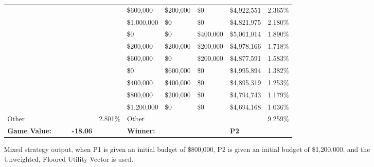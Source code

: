 \documentclass[11pt]{article}
\begin{document}
\begin{figure}
\begin{tabular}{ |p{1.0cm}p{1.0cm}p{1.0cm}p{2.0cm}|p{1.0cm}||p{1.0cm}p{1.0cm}p{1.0cm}p{2.0cm}|p{1.0cm}|}
& & & &                                                 & \$600,000 & \$200,000 & \$0 & \$4,922,551 & 2.365\% \\
& & & &                                                 & \$1,000,000 & \$0 & \$0 & \$4,821,975 & 2.180\% \\
& & & &                                                 & \$0 & \$0 & \$400,000 & \$5,061,014 & 1.890\% \\
& & & &                                                 & \$200,000 & \$200,000 & \$200,000 & \$4,978,166 & 1.718\% \\
& & & &                                                 & \$600,000 & \$0 & \$200,000 & \$4,877,591 & 1.583\% \\
& & & &                                                 & \$0 & \$600,000 & \$0 & \$4,995,894 & 1.382\% \\
& & & &                                                 & \$400,000 & \$400,000 & \$0 & \$4,895,319 & 1.253\% \\
& & & &                                                 & \$800,000 & \$200,000 & \$0 & \$4,794,743 & 1.179\% \\
& & & &                                                 & \$1,200,000 & \$0 & \$0 & \$4,694,168 & 1.036\% \\
\hline
Other & & & & 2.801\%                                   & Other & & & & 9.259\% \\
\hline
\small \textbf{Game Value:} &&& \small \textbf{-18.06} && \small \textbf{Winner:} &&& \small \textbf{P2}&\\
\hline
\end{tabular}
\caption{Mixed strategy output, when P1 is given an initial budget of \$800,000, P2 is given an initial budget of \$1,200,000, and the Unweighted, Floored Utility Vector is used.}
\label{8v12table.1}
\end{figure}
\end{document}
